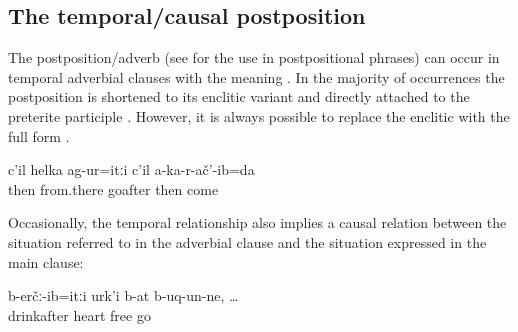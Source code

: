 \subsection{The temporal/causal postposition  }
\label{sec:temporalcausal postposition hiti}

The postposition/adverb   (see  for the use in postpositional phrases) can occur in temporal adverbial clauses with the meaning . In the majority of occurrences the postposition is shortened to its enclitic variant  and directly attached to the preterite participle . However, it is always possible to replace the enclitic with the full form .
%
\begin{exe}
	\ex	\label{ex:‎‎‎After we left from there, I did not return.}
	\gll	c'il	helka	ag-ur=itːi	c'il	a-ka-r-ač'-ib=da\\
		then	from.there	goafter	then	come\\
	\glt	{}
\end{exe}

Occasionally, the temporal relationship also implies a causal relation between the situation referred to in the adverbial clause and the situation expressed in the main clause:
%
\begin{exe}
	\ex	\label{ex:After drinking the heart opened}
	\gll	b-erčː-ib=itːi	urk'i	b-at	b-uq-un-ne,	\ldots\\
		drinkafter	heart	\tsc{n-}free	go\\
	\glt	{}
\end{exe}


